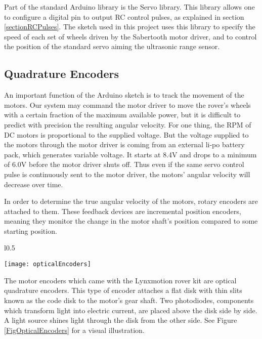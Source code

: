 Part of the standard Arduino library is the Servo library. This library allows one to configure a digital pin to output RC control pulses, as explained in section \ref{sectionRCPulses}. The sketch used in this project uses this library to specify the speed of each set of wheels driven by the Sabertooth motor driver, and to control the position of the standard servo aiming the ultrasonic range sensor.

%

\subsection{Quadrature Encoders} \label{sectionQuadEncoders}
An important function of the Arduino sketch is to track the movement of the motors. Our system may command the motor driver to move the rover's wheels with a certain fraction of the maximum available power, but it is difficult to predict with precision the resulting angular velocity. For one thing, the RPM of DC motors is proportional to the supplied voltage. But the voltage supplied to the motors through the motor driver is coming from an external li-po battery pack, which generates variable voltage. It starts at 8.4V and drops to a minimum of 6.0V before the motor driver shuts off. Thus even if the same servo control pulse is continuously sent to the motor driver, the motors' angular velocity will decrease over time.

In order to determine the true angular velocity of the motors, rotary encoders are attached to them. These feedback devices are incremental position encoders, meaning they monitor the change in the motor shaft's position compared to some starting position. 

\begin{wrapfigure}{l}{0.5\textwidth}
	\caption{\cite{fig_optical_encoders}}
	\centering
	\texttt{[image: opticalEncoders]}
	\label{FigOpticalEncoders}
\end{wrapfigure}

The motor encoders which came with the Lynxmotion rover kit are optical quadrature encoders. This type of encoder attaches a flat disk with thin slits known as the code disk to the motor's gear shaft. Two photodiodes, components which transform light into electric current, are placed above the disk side by side. A light source shines light through the disk from the other side. See Figure \ref{FigOpticalEncoders} for a visual illustration.

